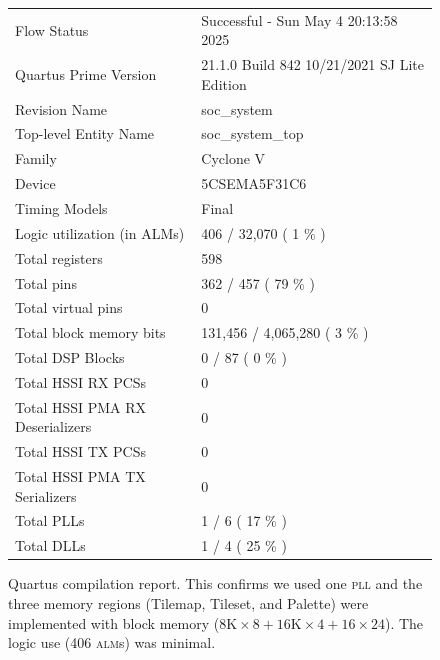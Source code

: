 \documentclass[11pt]{article}
\begin{document}
\begin{figure}
  {\footnotesize
    \begin{tabular}{ll}
  Flow Status                    & Successful - Sun May  4 20:13:58 2025       \\
 Quartus Prime Version           & 21.1.0 Build 842 10/21/2021 SJ Lite Edition \\
 Revision Name                   & soc\_system                                  \\
 Top-level Entity Name           & soc\_system\_top                              \\
 Family                          & Cyclone V                                   \\
 Device                          & 5CSEMA5F31C6                                \\
 Timing Models                   & Final                                       \\
 Logic utilization (in ALMs)     & 406 / 32,070 ( 1 \% )                        \\
 Total registers                 & 598                                         \\
 Total pins                      & 362 / 457 ( 79 \% )                          \\
 Total virtual pins              & 0                                           \\
 Total block memory bits         & 131,456 / 4,065,280 ( 3 \% )                 \\
 Total DSP Blocks                & 0 / 87 ( 0 \% )                              \\
 Total HSSI RX PCSs              & 0                                           \\
 Total HSSI PMA RX Deserializers & 0                                           \\
 Total HSSI TX PCSs              & 0                                           \\
 Total HSSI PMA TX Serializers   & 0                                           \\
 Total PLLs                      & 1 / 6 ( 17 \% )                              \\
 Total DLLs                      & 1 / 4 ( 25 \% )                              \\
  \end{tabular}}
  \caption{Quartus compilation report.  This confirms we used one
    \textsc{pll} and the three memory regions (Tilemap, Tileset, and
    Palette) were implemented with block memory ($8\text{K} \times 8 +
    16\text{K} \times 4 + 16 \times 24$).  The logic use (406
    \textsc{alm}s) was minimal.}

  \label{fig:synthesis-results}

\end{figure}
\end{document}

